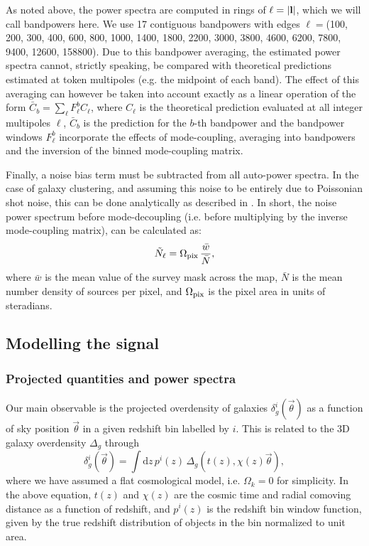 \documentclass[a4paper,11pt]{article}
\newcommand{\nv}{\vec{\theta}}
\begin{document}
    As noted above, the power spectra are computed in rings of $\ell=|{\bf l}|$, which we will call bandpowers here. We use 17 contiguous bandpowers with edges $\ell=$(100, 200, 300, 400, 600, 800, 1000, 1400, 1800, 2200, 3000, 3800, 4600, 6200, 7800, 9400, 12600, 158800). Due to this bandpower averaging, the estimated power spectra cannot, strictly speaking, be compared with theoretical predictions estimated at token multipoles (e.g. the midpoint of each band). The effect of this averaging can however be taken into account exactly as a linear operation of the form $\bar{C}_b=\sum_\ell F^b_{\ell} C_\ell$, where $C_\ell$ is the theoretical prediction evaluated at all integer multipoles $\ell$, $\bar{C}_b$ is the prediction for the $b$-th bandpower and the bandpower windows $F^b_{\ell}$ incorporate the effects of mode-coupling, averaging into bandpowers and the inversion of the binned mode-coupling matrix.
    
    Finally, a noise bias term must be subtracted from all auto-power spectra. In the case of galaxy clustering, and assuming this noise to be entirely due to Poissonian shot noise, this can be done analytically as described in \cite{2019MNRAS.484.4127A}. In short, the noise power spectrum before mode-decoupling (i.e. before multiplying by the inverse mode-coupling matrix), can be calculated as:
    \begin{equation}\label{eq:nell}
      \tilde{N}_\ell = \Omega_{\rm pix}\,\frac{\bar{w}}{\bar{N}},
    \end{equation}
    where $\bar{w}$ is the mean value of the survey mask across the map, $\bar{N}$ is the mean number density of sources per pixel, and $\Omega_{\rm pix}$ is the pixel area in units of steradians.

  \subsection{Modelling the signal}\label{ssec:methods.theory}
  \subsubsection{Projected quantities and power spectra}\label{sssec:methods.theory.cellpk}
    Our main observable is the projected overdensity of galaxies $\delta^i_g(\nv)$ as a function of sky position $\nv$ in a given redshift bin labelled by $i$. This is related to the 3D galaxy overdensity $\Delta_g$ through
    \begin{equation}
      \delta^i_g(\nv)=\int \mathrm{d}z\,p^i(z)\,\Delta_g\left(t(z),\chi(z)\nv\right),
    \end{equation}
where we have assumed a flat cosmological model, i.e. $\Omega_{k} = 0$ for simplicity.
    In the above equation, $t(z)$ and $\chi(z)$ are the cosmic time and radial comoving distance as a function of redshift, and $p^i(z)$ is the redshift bin window function, given by the true redshift distribution of objects in the bin normalized to unit area.
  
\end{document}
